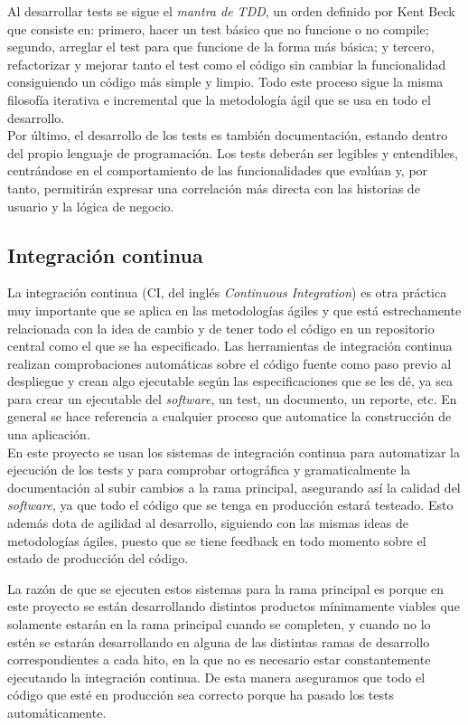 Al desarrollar tests se sigue el \textit{mantra de TDD}, un orden definido por
Kent Beck \cite{beck2002driven} que consiste en: primero, hacer un test básico
que no funcione o no compile; segundo, arreglar el test para que funcione de la
forma más básica; y tercero, refactorizar y mejorar tanto el test como el código
sin cambiar la funcionalidad consiguiendo un código más simple y limpio. Todo
este proceso sigue la misma filosofía iterativa e incremental que la metodología
ágil que se usa en todo el desarrollo.\\

Por último, el desarrollo de los tests es también documentación, estando dentro
del propio lenguaje de programación. Los tests deberán ser legibles y
entendibles, centrándose en el comportamiento de las funcionalidades que evalúan
y, por tanto, permitirán expresar una correlación más directa con las historias
de usuario y la lógica de negocio.

\subsection{Integración continua}
La integración continua (CI, del inglés \textit{Continuous Integration}) es otra
práctica muy importante que se aplica en las metodologías ágiles y que está
estrechamente relacionada con la idea de cambio y de tener todo el código en un
repositorio central como el que se ha especificado. Las herramientas de
integración continua realizan comprobaciones automáticas sobre el código fuente
como paso previo al despliegue y crean algo ejecutable según las
especificaciones que se les dé, ya sea para crear un ejecutable del
\textit{software}, un test, un documento, un reporte, etc. En general se hace
referencia a cualquier proceso que automatice la construcción de una
aplicación.\\

En este proyecto se usan los sistemas de integración continua para automatizar
la ejecución de los tests y para comprobar ortográfica y gramaticalmente la
documentación al subir cambios a la rama principal, asegurando así la calidad
del \textit{software}, ya que todo el código que se tenga en producción estará
testeado. Esto además dota de agilidad al desarrollo, siguiendo con las mismas
ideas de metodologías ágiles, puesto que se tiene feedback en todo momento sobre
el estado de producción del código.

La razón de que se ejecuten estos sistemas para la rama principal es porque en
este proyecto se están desarrollando distintos productos mínimamente viables que
solamente estarán en la rama principal cuando se completen, y cuando no lo estén
se estarán desarrollando en alguna de las distintas ramas de desarrollo
correspondientes a cada hito, en la que no es necesario estar constantemente
ejecutando la integración continua. De esta manera aseguramos que todo el código
que esté en producción sea correcto porque ha pasado los tests
automáticamente.\\

